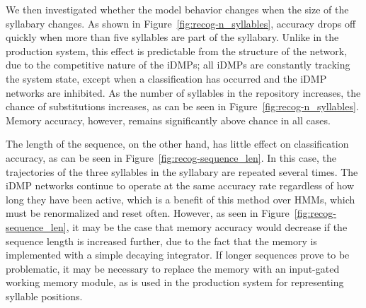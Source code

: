 
We then investigated whether the model
behavior changes when the size
of the syllabary changes.
As shown in Figure~\ref{fig:recog-n_syllables},
accuracy drops off quickly when
more than five syllables
are part of the syllabary.
Unlike in the production system,
this effect is predictable
from the structure of the network,
due to the competitive nature
of the iDMPs;
all iDMPs are constantly tracking
the system state,
except when a classification has occurred
and the iDMP networks are inhibited.
As the number of syllables in the repository increases,
the chance of substitutions increases,
as can be seen in Figure~\ref{fig:recog-n_syllables}.
Memory accuracy, however, remains significantly
above chance in all cases.


The length of the sequence,
on the other hand,
has little effect on classification accuracy,
as can be seen in Figure~\ref{fig:recog-sequence_len}.
In this case, the trajectories
of the three syllables in the syllabary
are repeated several times.
The iDMP networks continue to operate
at the same accuracy rate
regardless of how long they have been active,
which is a benefit of this method
over HMMs, which must be renormalized
and reset often.
However, as seen in Figure~\ref{fig:recog-sequence_len},
it may be the case that memory accuracy
would decrease if the sequence length
is increased further,
due to the fact that the memory
is implemented with a simple decaying integrator.
If longer sequences prove to be problematic,
it may be necessary to replace the memory
with an input-gated working memory module,
as is used in the production system
for representing syllable positions.

